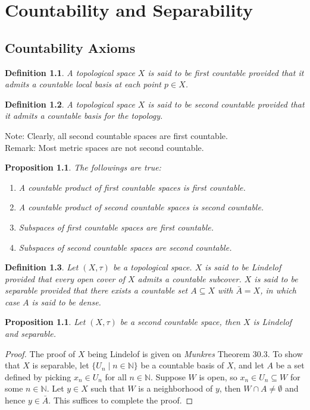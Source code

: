 \documentclass[11pt]{book}
\theoremstyle{break}
\theoremstyle{break}
\newtheorem{prop}[lem]{Proposition}
\newtheorem{defn}{Definition}[corL]
\newcommand{\N}{\mathbb{N}}
\newcommand{\note}{\color{red}Note: \color{black}}
\newcommand{\remark}{\color{blue}Remark: \color{black}}
\begin{document}
\newpage
\chapter{Countability and Separability}
\setcounter{section}{16}
\section[Countability Axioms]{\color{red} Countability Axioms\color{black}}
\begin{defn}
A topological space $X$ is said to be first countable provided that it admits a countable local basis at each point $p\in X$. 
\end{defn}

\begin{defn}
A topological space $X$ is said to be second countable provided that it admits a countable basis for the topology.
\end{defn}

\note Clearly, all second countable spaces are first countable.\\

\remark Most metric spaces are not second countable.

\begin{prop}
The followings are true:
\begin{enumerate}[topsep=3pt,itemsep=-1ex,partopsep=1ex,parsep=1ex]
\item A countable product of first countable spaces is first countable. 
\item A countable product of second countable spaces is second countable. 
\item Subspaces of first countable spaces are first countable.
\item Subspaces of second countable spaces are second countable.
\end{enumerate}
\end{prop}

\begin{defn}
Let $(X,\tau)$ be a topological space. $X$ is said to be Lindelof provided that every open cover of $X$ admits a countable subcover. $X$ is said to be separable provided that there exists a countable set $A\subseteq X$ with $\bar{A} = X$, in which case $A$ is said to be dense. 
\end{defn}

\begin{prop}
Let $(X,\tau)$ be a second countable space, then $X$ is Lindelof and separable. 
\end{prop}
\begin{proof}
The proof of $X$ being Lindelof is given on \textit{Munkres} Theorem 30.3. To show that $X$ is separable, let $\{U_n \mid n \in \N\}$ be a countable basis of $X$, and let $A$ be a set defined by picking $x_n \in U_n$ for all $n \in \N$. Suppose $W$ is open, so $x_n \in U_n \subseteq W$ for some $n \in \N$. Let $y \in X$ such that $W$ is a neighborhood of $y$, then $W\cap A  \neq \emptyset$ and hence $y \in \bar{A}$. This suffices to complete the proof. 
\end{proof}
\end{document}
